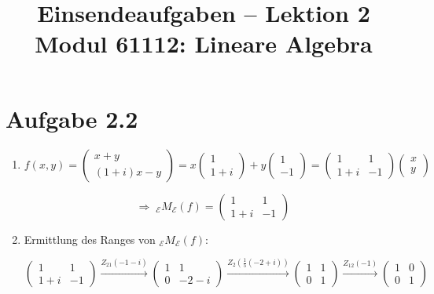 \documentclass[a4paper,12pt]{article}
\title{Einsendeaufgaben -- Lektion 2\\[0.5em]
\large Modul 61112: Lineare Algebra}
\author{}
\date{}
\begin{document}
\maketitle

\section*{Aufgabe 2.2}

\begin{enumerate}[label=\alph*)]

\item
\[
  f(x,y) = \begin{pmatrix} x+y \\ (1+i)x - y \end{pmatrix}
  = x \begin{pmatrix} 1 \\ 1+i \end{pmatrix} + y \begin{pmatrix} 1 \\ -1 \end{pmatrix}
  = \begin{pmatrix} 1 & 1 \\ 1+i & -1 \end{pmatrix} \begin{pmatrix} x \\ y \end{pmatrix}
\]

\[
  \Rightarrow \; {}_{\mathcal{E}}M_{\mathcal{E}}(f) = \begin{pmatrix} 1 & 1 \\ 1+i & -1 \end{pmatrix}
\]

\item Ermittlung des Ranges von ${}_{\mathcal{E}}M_{\mathcal{E}}(f)$:

\[
  \begin{pmatrix} 1 & 1 \\ 1+i & -1 \end{pmatrix}
  \xrightarrow{Z_{21}(-1-i)}
  \begin{pmatrix} 1 & 1 \\ 0 & -2-i \end{pmatrix}
  \xrightarrow{Z_2\!\left(\frac{1}{5}(-2+i)\right)}
  \begin{pmatrix} 1 & 1 \\ 0 & 1 \end{pmatrix}
  \xrightarrow{Z_{12}(-1)}
  \begin{pmatrix} 1 & 0 \\ 0 & 1 \end{pmatrix}
\]


\end{enumerate}
\end{document}
